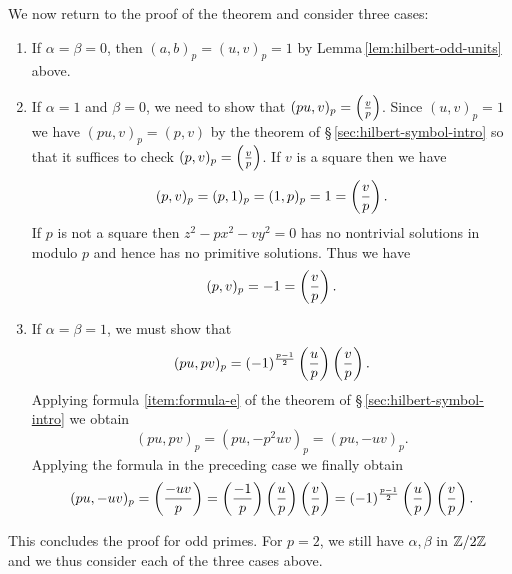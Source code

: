 \bigskip

We now return to the proof of the theorem and consider three cases:

\smallskip

\begin{enumerate}[nosep, label=(\roman*), wide]
    \item If \(\alpha = \beta = 0\), then \((a, b)_p = (u, v)_p = 1\) by Lemma\,\ref{lem:hilbert-odd-units} above.
    \item If \(\alpha = 1\) and \(\beta = 0\), we need to show that \((pu, v)_p ={ \left(\frac{v}{p}\right)}\). Since \((u, v)_p = 1\) we have \((pu, v)_p = (p,v)\) by the theorem of \S\,\ref{sec:hilbert-symbol-intro} so that it suffices to check \((p, v)_p ={\left(\frac{v}{p}\right)}\). If \(v\) is a square then we have
    \[
    (p, v)_p = (p, 1)_p = (1, p)_p = 1 = \left(\frac{v}{p}\right).
    \]
    If \(p\) is not a square then \(z^2 - px^2 - vy^2 = 0\) has no nontrivial solutions in modulo \(p\) and hence has no primitive solutions. Thus we have
    \[
    (p, v)_p = -1 = \left(\frac{v}{p}\right).
    \]
    \item If \(\alpha = \beta = 1\), we must show that
    \[
    (pu, pv)_p = (-1)^{\frac{p-1}{2}}\left(\frac{u}{p}\right)\left(\frac{v}{p}\right).
    \]
    Applying formula \ref{item:formula-e} of the theorem of \S\,\ref{sec:hilbert-symbol-intro} we obtain
    \[
    (pu, pv)_p = (pu, -p^2uv)_p = (pu, -uv)_p.
    \]
    Applying the formula in the preceding case we finally obtain
    \[
    (pu, -uv)_p = \left(\frac{-uv}{p}\right) =\left(\frac{-1}{p}\right) \left(\frac{u}{p}\right)\left(\frac{v}{p}\right) = (-1)^{\frac{p-1}{2}}\left(\frac{u}{p}\right)\left(\frac{v}{p}\right).
    \]
\end{enumerate}

This concludes the proof for odd primes. For \(p = 2\), we still have \(\alpha, \beta\) in \(\mathbb{Z}/2\mathbb{Z}\) and we thus consider each of the three cases above.

\smallskip

